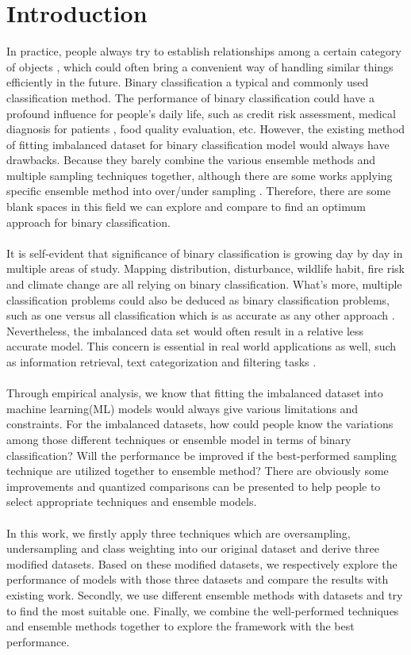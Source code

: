 \documentclass{article}
\begin{document}
\section{Introduction}
In practice, people always try to establish relationships among a certain category of objects \citep{Classification}, which could often bring a convenient way of handling similar things efficiently in the future. Binary classification a typical and commonly used classification method. The performance of binary classification could have a profound influence for people’s daily life, such as credit risk assessment, medical diagnosis for patients  \citep{binary}, food quality evaluation, etc. However, the existing method of fitting imbalanced dataset for binary classification model would always have drawbacks. Because they barely combine the various ensemble methods and multiple sampling techniques together, although there are some works applying specific ensemble method into over/under sampling   \citep{ensemble}. Therefore, there are some blank spaces in this field we can explore and compare to find an optimum approach for binary classification.
\\\\It is self-evident that significance of binary classification is growing day by day in multiple areas of study. Mapping distribution, disturbance, wildlife habit, fire risk and climate change \citep{comparsion} are all relying on binary classification. What’s more, multiple classification problems could also be deduced as binary classification problems, such as one versus all classification which is as accurate as any other approach \citep{onvsall}. Nevertheless, the imbalanced data set would often result in a relative less accurate model. This concern is essential in real world applications as well, such as information retrieval, text categorization and filtering tasks \citep{pattern}.
\\\\Through empirical analysis, we know that fitting the imbalanced dataset into machine learning(ML) models would always give various limitations and constraints. For the imbalanced datasets, how could people know the variations among those different techniques or ensemble model in terms of binary classification? Will the performance be improved if the best-performed sampling technique are utilized together to ensemble method? There are obviously some improvements and quantized comparisons can be presented to help people to select appropriate techniques and ensemble models.
\\\\In this work, we firstly apply three techniques which are oversampling, undersampling and class weighting into our original dataset and derive three modified datasets. Based on these modified datasets, we respectively explore the performance of models with those three datasets and compare the results with existing work. Secondly, we use different ensemble methods with datasets and try to find the most suitable one. Finally, we combine the well-performed techniques and ensemble methods together to explore the framework with the best performance.
\end{document}

